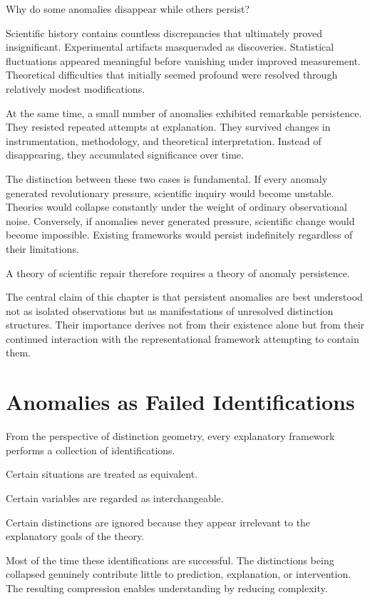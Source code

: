 \documentclass[11pt,oneside,openany]{book}
\begin{document}
Why do some anomalies disappear while others persist?

Scientific history contains countless discrepancies that ultimately proved insignificant. Experimental artifacts masqueraded as discoveries. Statistical fluctuations appeared meaningful before vanishing under improved measurement. Theoretical difficulties that initially seemed profound were resolved through relatively modest modifications.

At the same time, a small number of anomalies exhibited remarkable persistence. They resisted repeated attempts at explanation. They survived changes in instrumentation, methodology, and theoretical interpretation. Instead of disappearing, they accumulated significance over time.

The distinction between these two cases is fundamental. If every anomaly generated revolutionary pressure, scientific inquiry would become unstable. Theories would collapse constantly under the weight of ordinary observational noise. Conversely, if anomalies never generated pressure, scientific change would become impossible. Existing frameworks would persist indefinitely regardless of their limitations.

A theory of scientific repair therefore requires a theory of anomaly persistence.

The central claim of this chapter is that persistent anomalies are best understood not as isolated observations but as manifestations of unresolved distinction structures. Their importance derives not from their existence alone but from their continued interaction with the representational framework attempting to contain them.

\section{Anomalies as Failed Identifications}

From the perspective of distinction geometry, every explanatory framework performs a collection of identifications.

Certain situations are treated as equivalent.

Certain variables are regarded as interchangeable.

Certain distinctions are ignored because they appear irrelevant to the explanatory goals of the theory.

Most of the time these identifications are successful. The distinctions being collapsed genuinely contribute little to prediction, explanation, or intervention. The resulting compression enables understanding by reducing complexity.
\end{document}
